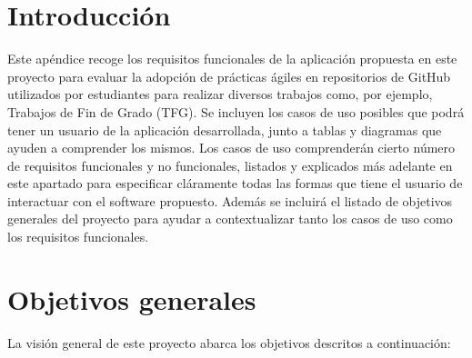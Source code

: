 
\section{Introducción}

Este apéndice recoge los requisitos funcionales de la aplicación propuesta en este proyecto para evaluar la adopción de prácticas ágiles en repositorios de GitHub utilizados por estudiantes para realizar diversos trabajos como, por ejemplo, Trabajos de Fin de Grado (TFG). Se incluyen los casos de uso posibles que podrá tener un usuario de la aplicación desarrollada, junto a tablas y diagramas que ayuden a comprender los mismos. Los casos de uso comprenderán cierto número de requisitos funcionales y no funcionales, listados y explicados más adelante en este apartado para especificar cláramente todas las formas que tiene el usuario de interactuar con el software propuesto. Además se incluirá el listado de objetivos generales del proyecto para ayudar a contextualizar tanto los casos de uso como los requisitos funcionales.

\section{Objetivos generales}
La visión general de este proyecto abarca los objetivos descritos a continuación:

